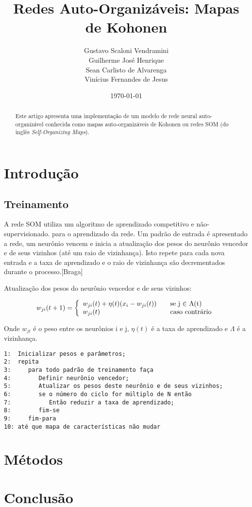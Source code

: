 \documentclass[a4paper]{article}
\title{Redes Auto-Organizáveis: Mapas de Kohonen}
\author{Gustavo Scaloni Vendramini    \\ 
        Guilherme José Henrique       \\
        Sean Carlisto de Alvarenga    \\
        Vinícius Fernandes de Jesus}
\date{\today}
\begin{document}
\maketitle

\begin{abstract}
Este artigo apresenta uma implementação de um modelo de rede neural auto-organizável conhecida como mapas auto-organizáveis de Kohonen ou redes SOM (do inglês \textit{Self-Organizing Maps}).
\end{abstract}

\section{Introdução}\label{introducao}



\subsection{Treinamento}\label{treinamento}
A rede SOM utiliza um algoritmo de aprendizado competitivo e não-supervisionado. para o aprendizado da rede. Um padrão de entrada é apresentado a rede, um neurônio vencem e inicia a atualização dos pesos do neurônio vencedor e de seus vizinhos (até um raio de vizinhança). Isto repete para cada nova entrada e a taxa de aprendizado e o raio de vizinhança são decrementados durante o processo.[Braga]

Atualização dos pesos do neurônio vencedor e de seus vizinhos:

\[ w_{ji}(t+1) = \left\{ 
  \begin{array}{l l}
    w_{ji}(t) + \eta(t)(x_{i}- w_{ji}(t)) & \quad \text{se j $\in$ $\Lambda$(t)}\\
    w_{ji}(t) & \quad \text{caso contrário}
  \end{array} \right.\]

Onde $w_{ji}$ é o peso entre os neurônios i e j, $\eta(t)$ é a taxa de aprendizado e $\Lambda$ é a vizinhança.

\begin{verbatim}
1:  Inicializar pesos e parâmetros;
2:  repita
3:     para todo padrão de treinamento faça
4:        Definir neurônio vencedor;
5:        Atualizar os pesos deste neurônio e de seus vizinhos;
6:        se o número do ciclo for múltiplo de N então
7:           Então reduzir a taxa de aprendizado;
8:        fim-se
9:     fim-para
10: até que mapa de características não mudar
\end{verbatim}



\section{Métodos}\label{metodos}





\section{Conclusão}\label{conclusao}




\end{document}
